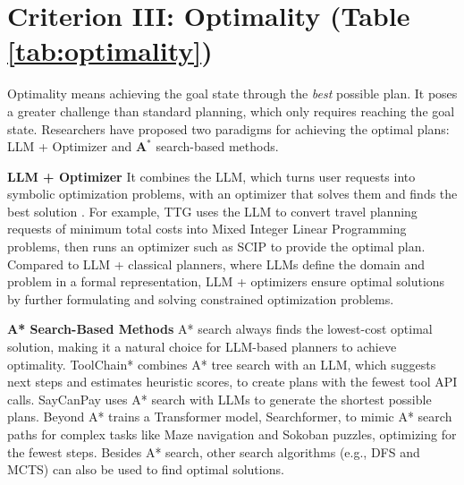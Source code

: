 \section{Criterion III: Optimality (Table \ref{tab:optimality})} \label{sec:optimality}

Optimality means achieving the goal state through the \emph{best} possible plan. It poses a greater challenge than standard planning, which only requires reaching the goal state. Researchers have proposed two paradigms for achieving the optimal plans: LLM + Optimizer and $\textbf{A}^*$ search-based methods. \smallskip

\noindent\textbf{LLM + Optimizer}\;\; It combines the LLM, which turns user requests into symbolic optimization problems, with an optimizer that solves them and finds the best solution \cite{ju2024globe, hao2024planning}. For example, TTG \citep{ju2024globe} uses the LLM to convert travel planning requests of minimum total costs into Mixed Integer Linear Programming problems, then runs an optimizer such as SCIP \citep{bestuzheva2021scip} to provide the optimal plan. Compared to LLM + classical planners, where LLMs define the domain and problem in a formal representation, LLM + optimizers ensure optimal solutions by further formulating and solving constrained optimization problems. \smallskip

\noindent\textbf{A* Search-Based Methods} A* search always finds the lowest-cost optimal solution, making it a natural choice for LLM-based planners to achieve optimality. ToolChain* \cite{zhuang2023toolchain} combines A* tree search with an LLM, which suggests next steps and estimates heuristic scores, to create plans with the fewest tool API calls. SayCanPay \citep{hazra2024saycanpay} uses A* search with LLMs to generate the shortest possible plans. Beyond A* \citep{lehnert2024beyond} trains a Transformer model, Searchformer, to mimic A* search paths for complex tasks like Maze navigation and Sokoban puzzles, optimizing for the fewest steps. Besides A* search, other search algorithms (e.g., DFS and MCTS) can also be used to find optimal solutions.
